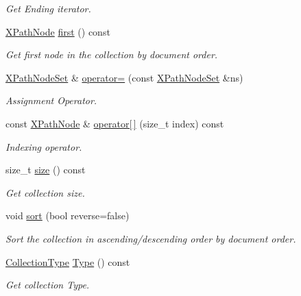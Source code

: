 \begin{DoxyCompactItemize}
\begin{DoxyCompactList}\small\item\em Get Ending iterator. \item\end{DoxyCompactList}\item 
\hyperlink{classMezzanine_1_1xml_1_1XPathNode}{XPathNode} \hyperlink{classMezzanine_1_1xml_1_1XPathNodeSet_aee7c20a6021d2e45438d632cec1b56bb}{first} () const 
\begin{DoxyCompactList}\small\item\em Get first node in the collection by document order. \item\end{DoxyCompactList}\item 
\hyperlink{classMezzanine_1_1xml_1_1XPathNodeSet}{XPathNodeSet} \& \hyperlink{classMezzanine_1_1xml_1_1XPathNodeSet_a6b93cebbcf20d7ed3fe59d4fec5d0010}{operator=} (const \hyperlink{classMezzanine_1_1xml_1_1XPathNodeSet}{XPathNodeSet} \&ns)
\begin{DoxyCompactList}\small\item\em Assignment Operator. \item\end{DoxyCompactList}\item 
const \hyperlink{classMezzanine_1_1xml_1_1XPathNode}{XPathNode} \& \hyperlink{classMezzanine_1_1xml_1_1XPathNodeSet_a7a140e56150d2adbac76ebe0ea0e88c0}{operator\mbox{[}$\,$\mbox{]}} (size\_\-t index) const 
\begin{DoxyCompactList}\small\item\em Indexing operator. \item\end{DoxyCompactList}\item 
size\_\-t \hyperlink{classMezzanine_1_1xml_1_1XPathNodeSet_a594098e61eae394f9fdbf9722a4db6e0}{size} () const 
\begin{DoxyCompactList}\small\item\em Get collection size. \item\end{DoxyCompactList}\item 
void \hyperlink{classMezzanine_1_1xml_1_1XPathNodeSet_a5c276fb12b0536d15c8cf3d12af6b8e4}{sort} (bool reverse=false)
\begin{DoxyCompactList}\small\item\em Sort the collection in ascending/descending order by document order. \item\end{DoxyCompactList}\item 
\hyperlink{classMezzanine_1_1xml_1_1XPathNodeSet_aea2172f847690de3cd556c2d4ffca2a7}{CollectionType} \hyperlink{classMezzanine_1_1xml_1_1XPathNodeSet_a807f29926c4d4f44c85a465cc2577b5d}{Type} () const 
\begin{DoxyCompactList}\small\item\em Get collection Type. \item\end{DoxyCompactList}\end{DoxyCompactItemize}


